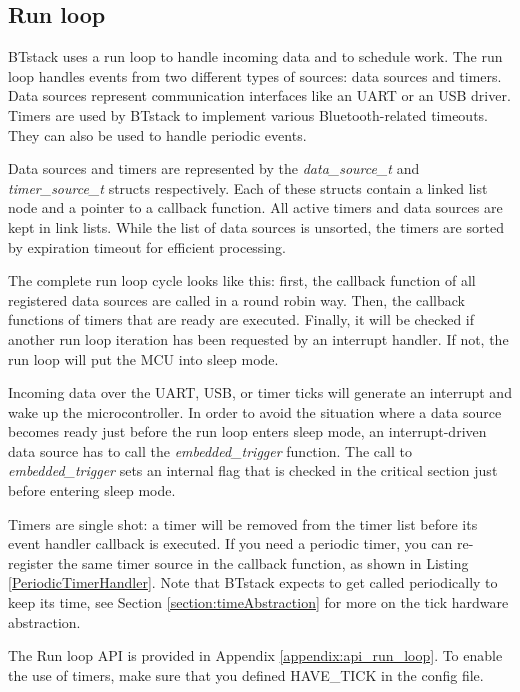 \documentclass[a4paper,titlepage,oneside,12pt]{amsart} %
\begin{document}
\subsection{Run loop}
\label{section:run_loop}

BTstack uses a run loop to handle incoming data and to schedule work. The run loop handles events from two different types of sources: data sources and timers. Data sources represent communication interfaces like an UART or an USB driver. Timers are used by BTstack to implement various Bluetooth-related timeouts. They can also be used to handle periodic events. 

Data sources and timers are represented by the \emph{data\_source\_t} and \emph{timer\_source\_t} structs respectively. Each of these structs contain a linked list node and a pointer to a callback function. All active timers and data sources are kept in link lists. While the list of data sources is unsorted, the timers are sorted by expiration timeout for efficient processing.

The complete run loop cycle looks like this: first, the callback function of all registered data sources are called in a round robin way. Then, the callback functions of timers that are ready are executed. Finally, it will be checked if another run loop iteration has been requested by an interrupt handler. If not, the run loop will put the MCU into sleep mode.

Incoming data over the UART, USB, or timer ticks will generate an interrupt and wake up the microcontroller. In order to avoid the situation where a data source becomes ready just before the run loop enters sleep mode, an interrupt-driven data source has to call the \emph{embedded\_trigger} function. The call to \emph{embedded\_trigger} sets an internal flag that is checked in the critical section just before entering sleep mode. 

Timers are single shot: a timer will be removed from the timer list before its event handler callback is executed. If you need a periodic timer, you can re-register the same timer source in the callback function, as shown in Listing \ref{PeriodicTimerHandler}. Note that BTstack expects to get called periodically to keep its time, see Section \ref{section:timeAbstraction} for more on the tick hardware abstraction. 

The Run loop API is provided in Appendix \ref{appendix:api_run_loop}. To enable the use of timers, make sure that you defined HAVE\_TICK in the config file.
\end{document}
